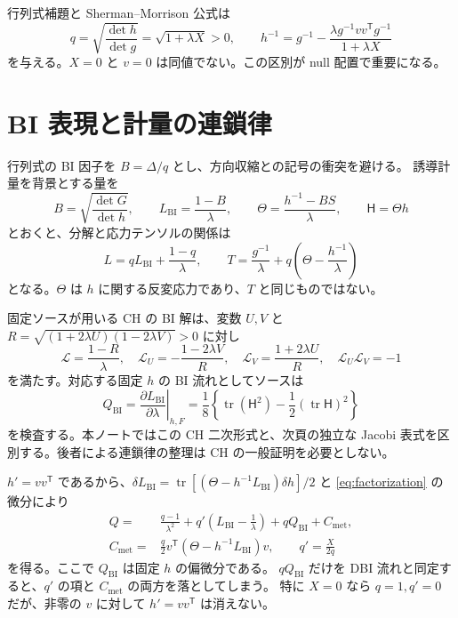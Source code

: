 \documentclass[11pt,a4paper]{article}
\newcommand{\tr}{\operatorname{tr}}
\newcommand{\Thmix}{\mathsf{H}}
\newcommand{\Qbi}{Q_{\mathrm{BI}}}
\newcommand{\Cmet}{C_{\mathrm{met}}}
\newcommand{\Lbi}{L_{\mathrm{BI}}}
\begin{document}
行列式補題と Sherman--Morrison 公式は
\begin{equation}\label{eq:q}
q=\sqrt{\frac{\det h}{\det g}}=\sqrt{1+\lambda X}>0,
\qquad h^{-1}=g^{-1}-\frac{\lambda g^{-1}vv^{\mathsf T}g^{-1}}
 {1+\lambda X}
\end{equation}
を与える。$X=0$ と $v=0$ は同値でない。この区別が null 配置で重要になる。

\newpage
\section{BI 表現と計量の連鎖律}
行列式の BI 因子を $B=\Delta/q$ とし、方向収縮との記号の衝突を避ける。
誘導計量を背景とする量を
\begin{equation}\label{eq:bi-definition}
B=\sqrt{\frac{\det G}{\det h}},\qquad
\Lbi=\frac{1-B}{\lambda},\qquad
\Theta=\frac{h^{-1}-BS}{\lambda},\qquad \Thmix=\Theta h
\end{equation}
とおくと、分解と応力テンソルの関係は
\begin{equation}\label{eq:factorization}
L=q\Lbi+\frac{1-q}{\lambda},\qquad
T=\frac{g^{-1}}\lambda+q\left(\Theta-\frac{h^{-1}}\lambda\right)
\end{equation}
となる。$\Theta$ は $h$ に関する反変応力であり、$T$ と同じものではない。

固定ソースが用いる CH の BI 解は、変数 $U,V$ と
$R=\sqrt{(1+2\lambda U)(1-2\lambda V)}>0$ に対し
\begin{equation}\label{eq:ch}
\mathcal L=\frac{1-R}{\lambda},\quad
\mathcal L_U=-\frac{1-2\lambda V}{R},\quad
\mathcal L_V=\frac{1+2\lambda U}{R},\quad
\mathcal L_U\mathcal L_V=-1
\end{equation}
を満たす。対応する固定 $h$ の BI 流れとしてソースは
\begin{equation}\label{eq:bi-flow}
\Qbi=\left.\frac{\partial\Lbi}{\partial\lambda}\right|_{h,F}
=\frac18\left\{\tr(\Thmix^2)-\frac12(\tr\Thmix)^2\right\}
\end{equation}
を検査する。本ノートではこの CH 二次形式と、次頁の独立な
Jacobi 表式を区別する。後者による連鎖律の整理は CH の一般証明を必要としない。

$h'=vv^{\mathsf T}$ であるから、$\delta\Lbi=
\tr[(\Theta-h^{-1}\Lbi)\delta h]/2$ と
\eqref{eq:factorization} の微分により
\begin{equation}\label{eq:chain}
\begin{split}
Q={}&\frac{q-1}{\lambda^2}
 +q'\left(\Lbi-\frac1\lambda\right)+q\Qbi+\Cmet,\\
\Cmet={}&\frac q2 v^{\mathsf T}(\Theta-h^{-1}\Lbi)v,
\qquad q'=\frac{X}{2q}
\end{split}
\end{equation}
を得る。ここで $\Qbi$ は固定 $h$ の偏微分である。
$q\Qbi$ だけを DBI 流れと同定すると、$q'$ の項と
$\Cmet$ の両方を落としてしまう。
特に $X=0$ なら $q=1,q'=0$ だが、非零の $v$ に対して
$h'=vv^{\mathsf T}$ は消えない。
\end{document}
